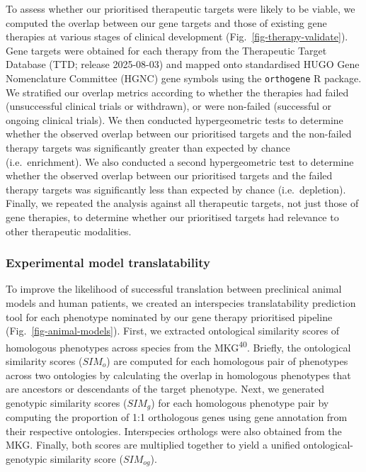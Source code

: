 \documentclass[
]{article}
\begin{document}
To assess whether our prioritised therapeutic targets were likely to be
viable, we computed the overlap between our gene targets and those of
existing gene therapies at various stages of clinical development
(Fig.~\ref{fig-therapy-validate}). Gene targets were obtained for each
therapy from the Therapeutic Target Database (TTD; release 2025-08-03)
and mapped onto standardised HUGO Gene Nomenclature Committee (HGNC)
gene symbols using the \texttt{orthogene} R package. We stratified our
overlap metrics according to whether the therapies had failed
(unsuccessful clinical trials or withdrawn), or were non-failed
(successful or ongoing clinical trials). We then conducted
hypergeometric tests to determine whether the observed overlap between
our prioritised targets and the non-failed therapy targets was
significantly greater than expected by chance (i.e.~enrichment). We also
conducted a second hypergeometric test to determine whether the observed
overlap between our prioritised targets and the failed therapy targets
was significantly less than expected by chance (i.e.~depletion).
Finally, we repeated the analysis against all therapeutic targets, not
just those of gene therapies, to determine whether our prioritised
targets had relevance to other therapeutic modalities.

\subsubsection{Experimental model
translatability}\label{experimental-model-translatability-1}

To improve the likelihood of successful translation between preclinical
animal models and human patients, we created an interspecies
translatability prediction tool for each phenotype nominated by our gene
therapy prioritised pipeline (Fig.~\ref{fig-animal-models}). First, we
extracted ontological similarity scores of homologous phenotypes across
species from the MKG\textsuperscript{40}. Briefly, the ontological
similarity scores (\(SIM_o\)) are computed for each homologous pair of
phenotypes across two ontologies by calculating the overlap in
homologous phenotypes that are ancestors or descendants of the target
phenotype. Next, we generated genotypic similarity scores (\(SIM_g\))
for each homologous phenotype pair by computing the proportion of 1:1
orthologous genes using gene annotation from their respective
ontologies. Interspecies orthologs were also obtained from the MKG.
Finally, both scores are multiplied together to yield a unified
ontological-genotypic similarity score (\(SIM_{og}\)).
\end{document}
